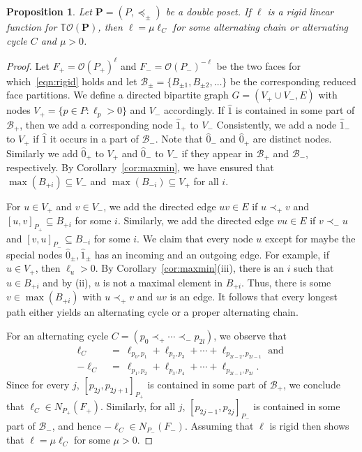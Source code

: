 \documentclass[11pt]{amsart}
\newtheorem{prop}[thm]{Proposition}
\theoremstyle{definition}
\begin{document}
\begin{prop}\label{prop:rigid}
    Let ${\mathbf{P}}=({P},\preceq_\pm)$ be a double poset. If $\ell$ is a rigid linear
    function for ${{\mathbb{T}}{\mathcal{O}({\mathbf{P}})}}$, then $\ell = \mu \ell_C$ for some
    alternating chain or alternating cycle $C$ and $\mu > 0$.
\end{prop}
\begin{proof}
    Let $F_+ = {\mathcal{O}({{P}_+})}^{\ell}$ and $F_- = {\mathcal{O}({{P}_-})}^{-\ell}$ be the two
    faces for which~\eqref{eqn:rigid} holds and let ${\mathcal{B}}_\pm = \{B_{\pm1},
    B_{\pm2},\dots\}$ be the corresponding reduced face partitions.  We define
    a directed bipartite graph $G = (V_+\cup V_-,E)$ with nodes $V_+ = \{ p
    \in {P} : \ell_p > 0 \}$ and $V_-$ accordingly. If ${\widehat{1}}$ is contained in
    some part of ${\mathcal{B}}_+$, then we add a corresponding node ${\widehat{1}}_+$ to
    $V_-$ Consistently, we add a node ${\widehat{1}}_-$ to $V_+$ if ${\widehat{1}}$ it occurs
    in a part of ${\mathcal{B}}_-$.  Note that ${\widehat{0}}_-$ and ${\widehat{0}}_+$ are distinct
    nodes.  Similarly we add ${\widehat{0}}_{+}$ to $V_+$ and ${\widehat{0}}_{-}$ to $V_-$ if
    they appear in ${\mathcal{B}}_+$ and ${\mathcal{B}}_-$, respectively.  By
    Corollary~\ref{cor:maxmin}, we have ensured that $\max(B_{+i}) \subseteq
    V_-$ and $\max(B_{-i}) \subseteq V_+$ for all $i$.
    
    For $u \in V_+$ and $v \in V_-$, we add the directed edge $uv \in E$ if $u
    \prec_+ v$ and $[u,v]_{{P}_+} \subseteq B_{+i}$ for some $i$. Similarly, we
    add the directed edge $vu \in E$ if $v \prec_- u$ and $[v,u]_{{P}_-}
    \subseteq B_{-i}$ for some $i$. We claim that every node $u$ except for
    maybe the special nodes ${\widehat{0}}_{\pm},{\widehat{1}}_{\pm}$ has an incoming and an
    outgoing edge. For example, if $u \in V_+$, then $\ell_u > 0$. By
    Corollary~\ref{cor:maxmin}(iii), there is an $i$ such that $u \in B_{+i}$
    and by (ii), $u$ is not a maximal element in $B_{+i}$.  Thus, there is
    some $v \in \max(B_{+i})$ with $u \prec_+ v$ and $uv$ is an edge.  It
    follows that every longest path either yields an alternating cycle or a
    proper alternating chain.

    For an alternating cycle $C = (p_0 \prec_+ \cdots \prec_- p_{2l})$, we
    observe that 
    \begin{align*}
        \ell_C &\ = \ 
        \ell_{p_0,p_1} + 
        \ell_{p_2,p_3} + 
        \cdots + 
        \ell_{p_{2l-2},p_{2l-1}} \text{ and } \\
        -\ell_C &\ = \ 
        \ell_{p_1,p_2} + 
        \ell_{p_3,p_4} + 
        \cdots + 
        \ell_{p_{2l-1},p_{2l}}.
    \end{align*}
    Since for every $j$, $[p_{2j},p_{2j+1}]_{{P}_+}$ is contained in some part
    of ${\mathcal{B}}_+$, we conclude that $\ell_C \in {N}_{{P}_+}(F_+)$.  Similarly,
    for all $j$, $[p_{2j-1},p_{2j}]_{{P}_-}$ is contained in some part of
    ${\mathcal{B}}_-$, and hence $-\ell_C \in {N}_{{P}_-}(F_-)$. Assuming that $\ell$
    is rigid then shows that $\ell = \mu \ell_C$ for some $\mu > 0$.


\end{proof}
\end{document}
